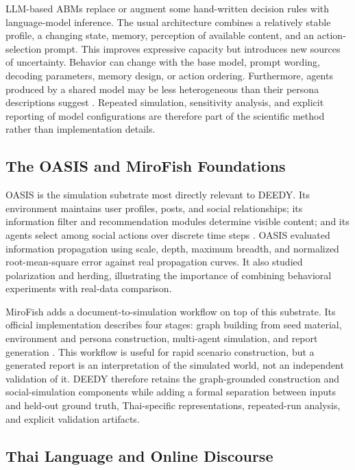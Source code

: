 \documentclass[10pt,twocolumn]{article}
\begin{document}
LLM-based ABMs replace or augment some hand-written decision rules with
language-model inference. The usual architecture combines a relatively stable
profile, a changing state, memory, perception of available content, and an
action-selection prompt. This improves expressive capacity but introduces new
sources of uncertainty. Behavior can change with the base model, prompt
wording, decoding parameters, memory design, or action ordering. Furthermore,
agents produced by a shared model may be less heterogeneous than their persona
descriptions suggest \citep{park2024diversity}. Repeated simulation,
sensitivity analysis, and explicit reporting of model configurations are
therefore part of the scientific method rather than implementation details.

\subsection{The OASIS and MiroFish Foundations}

OASIS is the simulation substrate most directly relevant to DEEDY. Its
environment maintains user profiles, posts, and social relationships; its
information filter and recommendation modules determine visible content; and
its agents select among social actions over discrete time steps
\citep{yang2024oasis}. OASIS evaluated information propagation using scale,
depth, maximum breadth, and normalized root-mean-square error against real
propagation curves. It also studied polarization and herding, illustrating the
importance of combining behavioral experiments with real-data comparison.

MiroFish adds a document-to-simulation workflow on top of this substrate. Its
official implementation describes four stages: graph building from seed
material, environment and persona construction, multi-agent simulation, and
report generation \citep{mirofish2026}. This workflow is useful for rapid
scenario construction, but a generated report is an interpretation of the
simulated world, not an independent validation of it. DEEDY therefore retains
the graph-grounded construction and social-simulation components while adding
a formal separation between inputs and held-out ground truth, Thai-specific
representations, repeated-run analysis, and explicit validation artifacts.

\subsection{Thai Language and Online Discourse}
\end{document}
